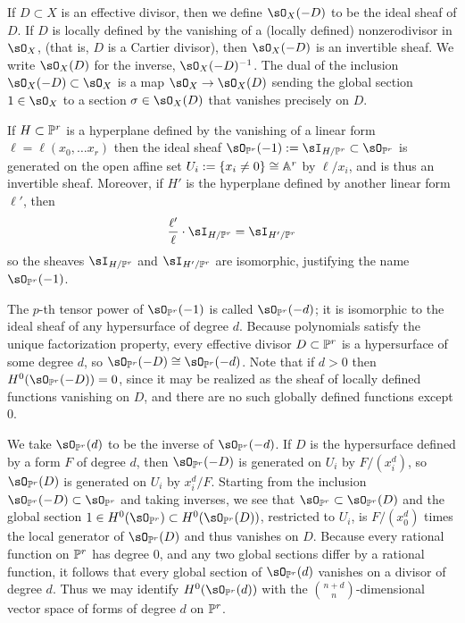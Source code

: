 If $D\subset X$ is an effective divisor, then we define $\sO_{X}(-D)$ to be the ideal sheaf of $D$. If $D$ is locally defined by the vanishing of a (locally defined) nonzerodivisor in $\sO_{X}$, (that is, $D$ is a Cartier divisor), then
$\sO_{X}(-D)$ is an invertible
sheaf.
We write $\sO_{X}(D)$ for the inverse, $\sO_{X}(-D)^{-1}$. The dual of the inclusion
$\sO_{X}(-D)\subset \sO_{X}$ is a map $\sO_{X} \to \sO_{X}(D)$ sending the global section $1\in \sO_{X}$ to a section
$\sigma\in \sO_{X}(D)$ that vanishes precisely on $D$.

\begin{example} \label{linear systems on Pr} If $H\subset \PP^{r}$ is a hyperplane defined by the vanishing of a linear form $\ell = \ell(x_{0}, \dots x_{r})$ then the ideal sheaf $\sO_{\PP^{r}}(-1) := \sI_{H/\PP^{r}}\subset \sO_{\PP^{r}}$ is generated on the open affine set 
$U_{i}:= \{x_{i}\neq 0\} \cong \AA^{r}$
by $\ell/x_{i}$, and is thus an invertible sheaf. 
Moreover, if $H'$ is the hyperplane defined by another linear form $\ell'$, then 
$$
\frac{\ell'}{\ell}\cdot\sI_{H/\PP^{r}} = \sI_{H'/\PP^{r}} 
$$
so the sheaves $\sI_{H/\PP^{r}}$ and $\sI_{H'/\PP^{r}} $ are isomorphic, justifying the name $\sO_{\PP^{r}}(-1)$.

The $p$-th tensor power of $\sO_{\PP^{r}}(-1)$ is called $\sO_{\PP^{r}}(-d)$; it is isomorphic to the
ideal sheaf of any hypersurface of degree $d$. Because polynomials satisfy the unique factorization property,
every effective divisor $D\subset \PP^{r}$ is a hypersurface of some degree $d$, so
$\sO_{\PP^{r}}(-D) \cong \sO_{\PP^{r}}(-d)$. Note that if $d>0$ then $H^{0}(\sO_{\PP^{r}}(-D)) = 0$, since it may be realized
as the sheaf of locally defined functions vanishing on $D$, and there are no such
globally defined functions except 0.

We take $\sO_{\PP^{r}}(d)$ to be the inverse of $\sO_{\PP^{r}}(-d)$. If $D$ is the hypersurface defined by 
a form $F$ of degree $d$, then $\sO_{\PP^{r}}(-D)$ is generated on $U_{i}$ by $F/(x_{i}^{d})$, so
$\sO_{\PP^{r}}(D)$ is generated on $U_{i}$ by $x_{i}^{d}/F$.
Starting from the inclusion 
$
\sO_{\PP^{r}}(-D) \subset \sO_{\PP^{r}}
$
and taking inverses, we see that 
$
\sO_{\PP^{r}} \subset \sO_{\PP^{r}}(D)
$
and the global section $1\in H^0(\sO_{\PP^{r}})\subset H^0(\sO_{\PP^{r}}(D))$, restricted to
$U_{i}$, is $F/(x_{0}^{d})$ times the local generator of $\sO_{\PP^{r}}(D)$ and thus vanishes on $D$.
 Because every
rational function on $\PP^{r}$ has degree 0, and any two global sections differ by a rational
function, it follows that every global section of $\sO_{\PP^{r}}(d)$ vanishes on a divisor of degree $d$. Thus
we may identify $H^{0}(\sO_{\PP^{r}}(d))$ with the ${n+d\choose n}$-dimensional vector space of forms of degree $d$ on $\PP^{r}$.
\end{example}


